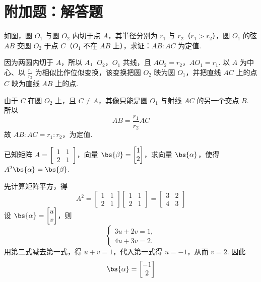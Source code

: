 \section{附加题：解答题}

\begin{problem}[A]
如图，圆 \(O_{1}\) 与圆 \(O_{2}\) 内切于点 \(A\)，其半径分别为 \(r_1\) 与 \(r_2\)（\(r_1>r_2\)），圆 \(O_{1}\) 的弦 \(AB\) 交圆 \(O_{2}\) 于点 \(C\)（\(O_{1}\) 不在 \(AB\) 上），求证：\(AB:AC\) 为定值.

\end{problem}

\begin{solution}
因为两圆内切于 \(A\)，所以 \(A\)，\(O_2\)，\(O_1\) 共线，且 \(AO_2=r_2\)，\(AO_1=r_1\). 以 \(A\) 为中心、以 \(\frac{r_1}{r_2}\) 为相似比作位似变换，该变换把圆 \(O_2\) 映为圆 \(O_1\)，并把直线 \(AC\) 上的点 \(C\) 映为直线 \(AB\) 上的点.

由于 \(C\) 在圆 \(O_2\) 上，且 \(C\neq A\)，其像只能是圆 \(O_1\) 与射线 \(AC\) 的另一个交点 \(B\). 所以
\[
AB=\frac{r_1}{r_2}AC
\]
故 \(AB:AC=r_1:r_2\)，为定值.
\end{solution}

\reuseproblemnumber
\begin{problem}[B]
已知矩阵 \(A=\begin{bmatrix}1&1\\ 2&1\end{bmatrix}\)，向量 \(\bs{\beta}=\begin{bmatrix}1\\ 2\end{bmatrix}\)，求向量 \(\bs{\alpha}\)，使得 \(A^{2}\bs{\alpha}=\bs{\beta}\).
\end{problem}

\begin{solution}
先计算矩阵平方，得
\[
A^2=\begin{bmatrix}1&1\\2&1\end{bmatrix}\begin{bmatrix}1&1\\2&1\end{bmatrix}=\begin{bmatrix}3&2\\4&3\end{bmatrix}
\]
设 \(\bs{\alpha}=\begin{bmatrix}u\\v\end{bmatrix}\)，则
\[
\begin{cases}
3u+2v=1,\\
4u+3v=2.
\end{cases}
\]
用第二式减去第一式，得 \(u+v=1\)，代入第一式得 \(u=-1\)，从而 \(v=2\). 因此
\[
\bs{\alpha}=\begin{bmatrix}-1\\2\end{bmatrix}
\]
\end{solution}

